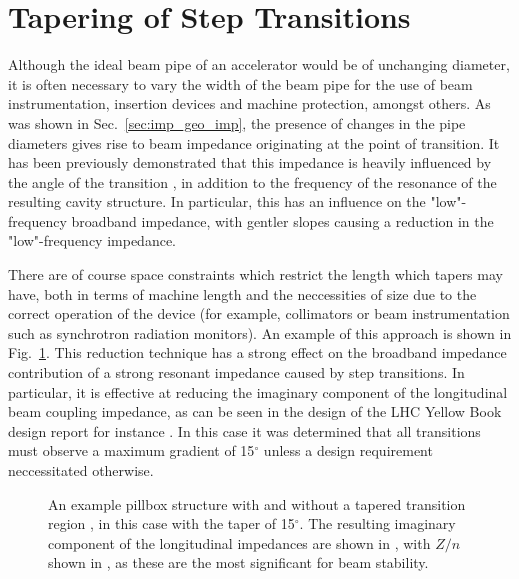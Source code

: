\section{Tapering of Step Transitions}
\label{sec:step_ins}

Although the ideal beam pipe of an accelerator would be of unchanging diameter, it is often necessary to vary the width of the beam pipe for the use of beam instrumentation, insertion devices and machine protection, amongst others. As was shown in Sec.~\ref{sec:imp_geo_imp}, the presence of changes in the pipe diameters gives rise to beam impedance originating at the point of transition. It has been previously demonstrated that this impedance is heavily influenced by the angle of the transition \cite{Podobedov:TaperedImp}, in addition to the frequency of the resonance of the resulting cavity structure. In particular, this has an influence on the "low"-frequency broadband impedance, with gentler slopes causing a reduction in the "low"-frequency impedance. 

There are of course space constraints which restrict the length which tapers may have, both in terms of machine length and the neccessities of size due to the correct operation of the device (for example, collimators or beam instrumentation such as synchrotron radiation monitors). An example of this approach is shown in Fig.~\ref{fig:taper_ex}. This reduction technique has a strong effect on the broadband impedance contribution of a strong resonant impedance caused by step transitions. In particular, it is effective at reducing the imaginary component of the longitudinal beam coupling impedance, as can be seen in the design of the LHC Yellow Book design report for instance \cite{Ruggiero:LHCColEff}. In this case it was determined that all transitions must observe a maximum gradient of 15$^{\circ}$ unless a design requirement neccessitated otherwise.

\begin{figure}
\begin{center}
\end{center}
\caption{An example pillbox structure with and without a tapered transition region , in this case with the taper of 15$^{\circ}$. The resulting imaginary component of the longitudinal impedances are shown in , with $Z/n$ shown in , as these are the most significant for beam stability.}
\label{fig:taper_ex}
\end{figure}

